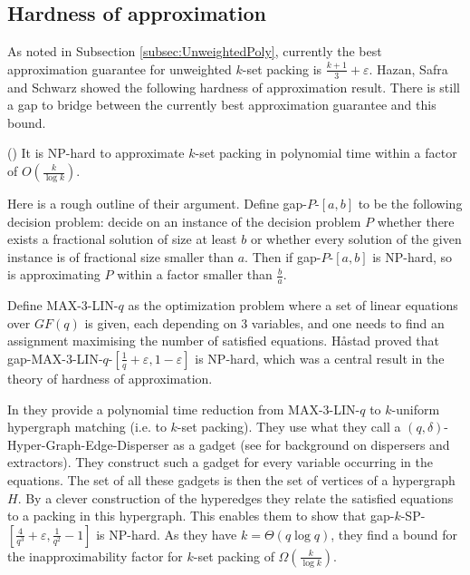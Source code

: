 \subsection{Hardness of approximation}\label{subsec:Hardness1}

As noted in Subsection \ref{subsec:UnweightedPoly}, currently the best approximation guarantee for unweighted $k$-set packing is $\frac{k+1}{3} + \varepsilon$. Hazan, Safra and Schwarz \cite{Hazan} showed the following hardness of approximation result. There is still a gap to bridge between the currently best approximation guarantee and this bound.

%
\begin{theorem}\label{thm:HardnessHazan}
(\cite{Hazan}) It is NP-hard to approximate $k$-set packing in polynomial time within a factor of $O \left( \frac{k}{\log k} \right)$.
\end{theorem}
%
Here is a rough outline of their argument. Define gap-$P$-$[a,b]$ to be the following decision problem: decide on an instance of the decision problem $P$ whether there exists a fractional solution of size at least $b$ or whether every solution of the given instance is of fractional size smaller than $a$. Then if gap-$P$-$[a,b]$ is NP-hard, so is approximating $P$ within a factor smaller than $\frac{b}{a}$.

Define MAX-3-LIN-$q$ as the optimization problem where a set of linear equations over $GF(q)$ is given, each depending on 3 variables, and one needs to find an assignment maximising the number of satisfied equations. H{\aa}stad \cite{Hardness1} proved that gap-MAX-3-LIN-$q$-$[\frac{1}{q} + \varepsilon, 1 - \varepsilon]$ is NP-hard, which was a central result in the theory of hardness of approximation. %

In \cite{Hazan} they provide a polynomial time reduction from MAX-3-LIN-$q$ to $k$-uniform hypergraph matching (i.e. to $k$-set packing). They use what they call a $(q,\delta)$-Hyper-Graph-Edge-Disperser as a gadget (see \cite{Disperser} for background on dispersers and extractors). They construct such a gadget for every variable occurring in the equations. The set of all these gadgets is then the set of vertices of a hypergraph $H$. By a clever construction of the hyperedges they relate the satisfied equations to a packing in this hypergraph. This enables them to show that gap-$k$-SP-$[\frac{4}{q^3} + \varepsilon, \frac{1}{q^2} - 1]$ is NP-hard. As they have $k = \Theta(q \log q)$, they find a bound for the inapproximability factor for $k$-set packing of $\Omega(\frac{k}{\log k})$.


